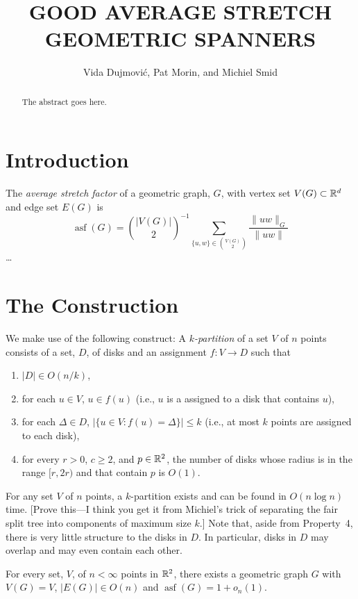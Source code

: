 \documentclass{patmorin}
\title{\MakeUppercase{Good Average Stretch Geometric Spanners}}
\author{Vida Dujmovi\'c, Pat Morin, and Michiel Smid}
\DeclareMathOperator{\asf}{asf}
\begin{document}
\begin{titlepage}
\maketitle

\begin{abstract}
  The abstract goes here.
\end{abstract}

\end{titlepage}

\section{Introduction}

The \emph{average stretch factor} of a geometric graph, $G$, with vertex
set $V(G)\subset \mathbb{R}^d$ and edge set $E(G)$ is
\[
    \asf(G) = \binom{|V(G)|}{2}^{-1}\sum_{\{u,w\}\in\binom{V(G)}{2}}\frac{\|uw\|_G}{\|uw\|}
\]
\ldots

\section{The Construction}

We make use of the following construct:  A \emph{$k$-partition} of a
set $V$ of $n$ points consists of a set, $D$,
of disks and an assignment $f:V\to D$ such that
\begin{enumerate}
  \item $|D|\in O(n/k)$,
  \item for each $u\in V$, $u\in f(u)$ (i.e., $u$ is a assigned to a
    disk that contains $u$),
  \item for each $\Delta\in D$, $|\{u\in V: f(u)=\Delta\}|\le k$ (i.e.,
   at most $k$ points are assigned to each disk),
  \item for every $r> 0$, $c\ge 2$, and $p\in\mathbb{R}^2$, the number of disks
   whose radius is in the range $[r,2r)$ and that contain $p$ is $O(1)$.
\end{enumerate}
For any set $V$ of $n$ points, a $k$-partition exists and can be found in
$O(n\log n)$ time. [Prove this---I think you get it from Michiel's trick
of separating the fair split tree into components of maximum size $k$.]
Note that, aside from Property~4, there is very little structure to
the disks in $D$. In particular, disks in $D$ may overlap and may
even contain each other.

\begin{thm}
  For every set, $V$, of $n<\infty$ points in $\mathbb{R}^2$, there exists a
  geometric graph $G$ with $V(G)=V$, $|E(G)|\in O(n)$ and $\asf(G)=1+o_n(1)$.
\end{thm}
\end{document}

